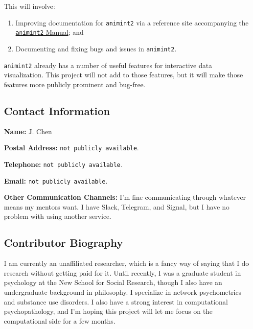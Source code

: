 \documentclass[
]{article}
\providecommand{\tightlist}{%
  \setlength{\itemsep}{0pt}\setlength{\parskip}{0pt}}\usepackage{longtable,booktabs,array}
\begin{document}
This will involve:

\begin{enumerate}
\def\labelenumi{\arabic{enumi}.}
\tightlist
\item
  Improving documentation for \texttt{animint2} via a reference site
  accompanying the
  \href{https://rcdata.nau.edu/genomic-ml/animint2-manual/Ch00-preface.html}{\texttt{animint2}
  Manual}; and
\item
  Documenting and fixing bugs and issues in \texttt{animint2}.
\end{enumerate}

\texttt{animint2} already has a number of useful features for
interactive data visualization. This project will not add to those
features, but it will make those features more publicly prominent and
bug-free.

\hypertarget{contact-information}{%
\subsection{Contact Information}\label{contact-information}}

\textbf{Name:} J. Chen

\textbf{Postal Address:} \texttt{not\ publicly\ available}.

\textbf{Telephone:} \texttt{not\ publicly\ available}.

\textbf{Email:} \texttt{not\ publicly\ available}.

\textbf{Other Communication Channels:} I'm fine communicating through
whatever means my mentors want. I have Slack, Telegram, and Signal, but
I have no problem with using another service.

\hypertarget{contributor-biography}{%
\subsection{Contributor Biography}\label{contributor-biography}}

I am currently an unaffiliated researcher, which is a fancy way of
saying that I do research without getting paid for it.
Until recently, I was a graduate student in psychology at the New School
for Social Research, though I also have an undergraduate background in
philosophy. I specialize in network psychometrics and substance use
disorders. I also have a strong interest in computational
psychopathology, and I'm hoping this project will let me focus on the
computational side for a few months.
\end{document}
